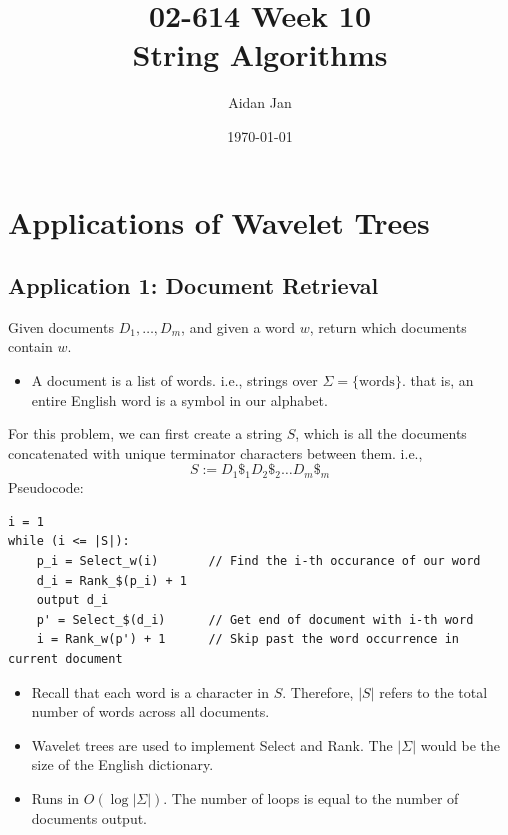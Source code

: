 \documentclass[10pt]{article}
\title{02-614 Week 10 \\ \large{String Algorithms}}
\author{Aidan Jan}
\date{\today}
\begin{document}
\maketitle

\section*{Applications of Wavelet Trees}

\subsection*{Application 1: Document Retrieval}
Given documents $D_1, \dots, D_m$, and given a word $w$, return which documents contain $w$.
\begin{itemize}
	\item A document is a list of words.  i.e., strings over $\Sigma = \{\text{words}\}$.  that is, an entire English word is a symbol in our alphabet.
\end{itemize}
For this problem, we can first create a string $S$, which is all the documents concatenated with unique terminator characters between them.  i.e.,
\[S := D_1\$_1 D_2\$_2 \dots D_m \$_m\]
Pseudocode:
\begin{verbatim}
i = 1
while (i <= |S|):
    p_i = Select_w(i)       // Find the i-th occurance of our word
    d_i = Rank_$(p_i) + 1   
    output d_i
    p' = Select_$(d_i)      // Get end of document with i-th word
    i = Rank_w(p') + 1      // Skip past the word occurrence in current document
\end{verbatim}
\begin{itemize}
	\item Recall that each word is a character in $S$.  Therefore, $|S|$ refers to the total number of words across all documents.
	\item Wavelet trees are used to implement Select and Rank.  The $|\Sigma|$ would be the size of the English dictionary.
	\item Runs in $O(\log |\Sigma|)$.  The number of loops is equal to the number of documents output.
\end{itemize}
\end{document}

